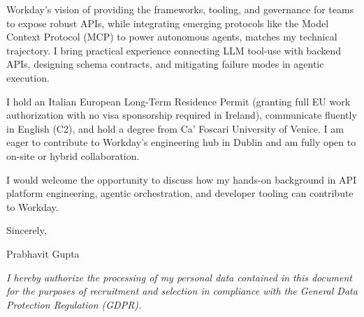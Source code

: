\documentclass[10.5pt,a4paper]{article}
\begin{document}
Workday's vision of providing the frameworks, tooling, and governance for teams to expose robust APIs, while integrating emerging protocols like the Model Context Protocol (MCP) to power autonomous agents, matches my technical trajectory. I bring practical experience connecting LLM tool-use with backend APIs, designing schema contracts, and mitigating failure modes in agentic execution.

I hold an Italian European Long-Term Residence Permit (granting full EU work authorization with no visa sponsorship required in Ireland), communicate fluently in English (C2), and hold a degree from Ca' Foscari University of Venice. I am eager to contribute to Workday's engineering hub in Dublin and am fully open to on-site or hybrid collaboration.

I would welcome the opportunity to discuss how my hands-on background in API platform engineering, agentic orchestration, and developer tooling can contribute to Workday.

Sincerely,

Prabhavit Gupta

\vspace{0.8em}
{\footnotesize \textit{I hereby authorize the processing of my personal data contained in this document for the purposes of recruitment and selection in compliance with the General Data Protection Regulation (GDPR).}\par}
\end{document}
